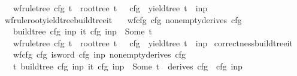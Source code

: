 \begin{isabellebody}
\ \ \ {\isachardoublequoteopen}wf{\isacharunderscore}{\kern0pt}rule{\isacharunderscore}{\kern0pt}tree\ cfg\ t\ {\isasymand}\ root{\isacharunderscore}{\kern0pt}tree\ t\ {\isacharequal}{\kern0pt}\ {\isasymSS}\ cfg\ {\isasymand}\ yield{\isacharunderscore}{\kern0pt}tree\ t\ {\isacharequal}{\kern0pt}\ inp{\isachardoublequoteclose}%
\isadelimproof
%
\endisadelimproof
%
\isatagproof
%
\endisatagproof
{\isafoldproof}%
%
\isadelimproof
\isanewline
%
\endisadelimproof
{}\isamarkupfalse%
\ wf{\isacharunderscore}{\kern0pt}rule{\isacharunderscore}{\kern0pt}root{\isacharunderscore}{\kern0pt}yield{\isacharunderscore}{\kern0pt}tree{\isacharunderscore}{\kern0pt}build{\isacharunderscore}{\kern0pt}tree{\isacharunderscore}{\kern0pt}{\isasymII}{\isacharunderscore}{\kern0pt}it{\isacharcolon}{\kern0pt}\isanewline
\ \ \ {\isachardoublequoteopen}wf{\isacharunderscore}{\kern0pt}cfg\ cfg{\isachardoublequoteclose}\ {\isachardoublequoteopen}nonempty{\isacharunderscore}{\kern0pt}derives\ cfg{\isachardoublequoteclose}\isanewline
\ \ \ {\isachardoublequoteopen}build{\isacharunderscore}{\kern0pt}tree\ cfg\ inp\ {\isacharparenleft}{\kern0pt}{\isasymII}{\isacharunderscore}{\kern0pt}it\ cfg\ inp{\isacharparenright}{\kern0pt}\ {\isacharequal}{\kern0pt}\ Some\ t{\isachardoublequoteclose}\isanewline
\ \ \ {\isachardoublequoteopen}wf{\isacharunderscore}{\kern0pt}rule{\isacharunderscore}{\kern0pt}tree\ cfg\ t\ {\isasymand}\ root{\isacharunderscore}{\kern0pt}tree\ t\ {\isacharequal}{\kern0pt}\ {\isasymSS}\ cfg\ {\isasymand}\ yield{\isacharunderscore}{\kern0pt}tree\ t\ {\isacharequal}{\kern0pt}\ inp{\isachardoublequoteclose}%
\isadelimproof
%
\endisadelimproof
%
\isatagproof
%
\endisatagproof
{\isafoldproof}%
%
\isadelimproof
\isanewline
%
\endisadelimproof
{}\isamarkupfalse%
\ correctness{\isacharunderscore}{\kern0pt}build{\isacharunderscore}{\kern0pt}tree{\isacharunderscore}{\kern0pt}{\isasymII}{\isacharunderscore}{\kern0pt}it{\isacharcolon}{\kern0pt}\isanewline
\ \ \ {\isachardoublequoteopen}wf{\isacharunderscore}{\kern0pt}cfg\ cfg{\isachardoublequoteclose}\ {\isachardoublequoteopen}is{\isacharunderscore}{\kern0pt}word\ cfg\ inp{\isachardoublequoteclose}\ {\isachardoublequoteopen}nonempty{\isacharunderscore}{\kern0pt}derives\ cfg{\isachardoublequoteclose}\isanewline
\ \ \ {\isachardoublequoteopen}{\isacharparenleft}{\kern0pt}{\isasymexists}t{\isachardot}{\kern0pt}\ build{\isacharunderscore}{\kern0pt}tree\ cfg\ inp\ {\isacharparenleft}{\kern0pt}{\isasymII}{\isacharunderscore}{\kern0pt}it\ cfg\ inp{\isacharparenright}{\kern0pt}\ {\isacharequal}{\kern0pt}\ Some\ t{\isacharparenright}{\kern0pt}\ {\isasymlongleftrightarrow}\ derives\ cfg\ {\isacharbrackleft}{\kern0pt}{\isasymSS}\ cfg{\isacharbrackright}{\kern0pt}\ inp{\isachardoublequoteclose}%

\end{isabellebody}
